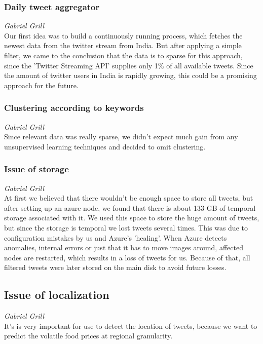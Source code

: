 \subsubsection*{Daily tweet aggregator}
\emph{Gabriel Grill} \\
Our first idea was to build a continuously running process, which fetches the newest data from the twitter stream from India. But after applying a simple filter, we came to the conclusion that the data is to sparse for this approach, since the 'Twitter Streaming API' supplies only 1\% of all available tweets. Since the amount of twitter users in India is rapidly growing, this could be a promising approach for the future.

\subsubsection*{Clustering according to keywords}
\emph{Gabriel Grill} \\
Since relevant data was really sparse, we didn't expect much gain from any unsupervised learning techniques and decided to omit clustering.

\subsubsection*{Issue of storage}
\emph{Gabriel Grill} \\
At first we believed that there wouldn't be enough space to store all tweets, but after setting up an azure node, we found that there is about 133 GB of temporal storage associated with it. We used this space to store the huge amount of tweets, but since the storage is temporal we lost tweets several times. This was due to configuration mistakes by us and Azure's 'healing'. When Azure detects anomalies, internal errors or just that it has to move images around, affected nodes are restarted, which results in a loss of tweets for us. Because of that, all filtered tweets were later stored on the main disk to avoid future losses.

\subsection*{Issue of localization}
\emph{Gabriel Grill} \\
It's is very important for use to detect the location of tweets, because we want to predict the volatile food prices at regional granularity.

